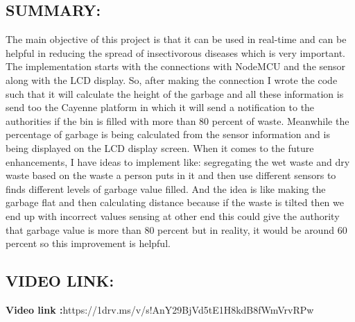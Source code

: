 \documentclass[12pt,letterpaper]{article}
\begin{document}
\subsection{SUMMARY: }
The main objective of this project is that it can be used in real-time and can be helpful in reducing the spread of insectivorous diseases which is very important. The implementation starts with the connections with NodeMCU and the sensor along with the LCD display. So, after making the connection I wrote the code such that it will calculate the height of the garbage and all these information is send too the Cayenne platform in which it will send a notification to the authorities if the bin is filled with more than 80 percent of waste. 
Meanwhile the percentage of garbage is being calculated from the sensor information and is being displayed on the LCD display screen. When it comes to the future enhancements, I have ideas to implement like: segregating the wet waste and dry waste based on the waste a person puts in it and then use different sensors to finds different levels of garbage value filled. And the idea is like making the garbage flat and then calculating distance because if the waste is tilted then we end up with incorrect values sensing at other end this could give the authority that garbage value is more than 80 percent but in reality, it would be around 60 percent so this improvement is helpful.

\subsection{VIDEO LINK: }
\textbf{Video link :}https://1drv.ms/v/s!AnY29BjVd5tE1H8kdB8fWmVrvRPw
\end{document}
